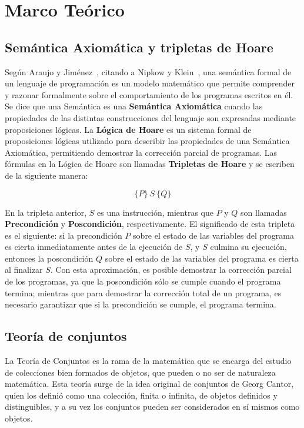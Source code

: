 \chapter{Marco Teórico}
\label{capitulo1}

\section{Semántica Axiomática y tripletas de Hoare}

Según Araujo y Jiménez~\cite{ayj}, citando a Nipkow y Klein~\cite{concrete}, una
semántica formal de un lenguaje de programación es un modelo matemático que
permite comprender y razonar formalmente sobre el comportamiento de los
programas escritos en él. Se dice que una Semántica es una \textbf{Semántica
Axiomática} cuando las propiedades de las  distintas construcciones del lenguaje
son expresadas mediante proposiciones lógicas. La \textbf{Lógica de Hoare} es un
sistema formal de proposiciones lógicas utilizado para describir  las
propiedades de una Semántica Axiomática, permitiendo demostrar la corrección
parcial de programas. Las fórmulas en la Lógica de Hoare son llamadas
\textbf{Tripletas de Hoare} y se escriben de la siguiente manera:

$$ \{P\}\ S\ \{Q\} $$

En la tripleta anterior, $S$ es una instrucción, mientras que $P$ y $Q$ son
llamadas \textbf{Precondición} y \textbf{Poscondición}, respectivamente. El
significado de esta tripleta es el siguiente: si la precondición $P$ sobre el
estado de las variables del programa es cierta inmediatamente antes de la
ejecución de $S$, y $S$ culmina su ejecución, entonces la poscondición $Q$ sobre
el estado de las variables del programa es cierta al finalizar $S$. Con esta
aproximación, es posible demostrar la corrección parcial de los programas, ya
que la poscondición sólo se cumple cuando el programa termina; mientras que para
demostrar la corrección total de un programa, es necesario garantizar que si la
precondición se cumple, el programa termina.

\section{Teoría de conjuntos}

La Teoría de Conjuntos es la rama de la matemática que se encarga del estudio de
colecciones bien formados de objetos, que pueden o no ser de naturaleza
matemática. Esta teoría surge de la idea original de conjuntos de Georg Cantor,
quien los definió como una colección, finita o infinita, de objetos definidos y
distinguibles, y a su vez los conjuntos pueden ser considerados en sí mismos
como objetos.

